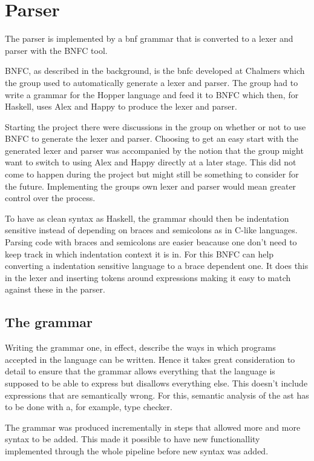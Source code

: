 \section{Parser}


The parser is implemented by a \acrlong{bnf} grammar that is converted to a lexer and 
parser with the BNFC tool. 

BNFC, as described in the background, is the \Gls{bnfc} developed at Chalmers which the group used to automatically generate a lexer and parser. The group had to write a grammar for the Hopper language and feed it to BNFC which then, for Haskell, uses Alex\cite{alex} and Happy\cite{happy} to produce the lexer and parser.

Starting the project there were discussions in the group on whether or not to use BNFC to generate the lexer and parser. Choosing to get an easy start with the generated lexer and parser was accompanied by the notion that the group might want to switch to using Alex and Happy directly at a later stage. This did not come to happen during the project but might still be something to consider for the future. Implementing the groups own lexer and parser would mean greater control over the process.

To have as clean syntax as Haskell, the grammar should then be indentation sensitive instead of depending on braces and semicolons as in C-like languages. Parsing code with braces and semicolons are easier beacause one don't need to keep track in which indentation context it is in. For this BNFC can help converting a indentation sensitive language to a brace dependent one. It does this in the lexer and inserting tokens around expressions making it easy to match against these in the parser.

\subsection{The grammar}

Writing the grammar one, in effect, describe the ways in which programs accepted in the language can be written. Hence it takes great consideration to detail to ensure that the grammar allows everything that the language is supposed to be able to express but disallows everything else. This doesn't include expressions that are semantically wrong. For this, semantic analysis of the \acrshort{ast} has to be done with a, for example, type checker. 

The grammar was produced incrementally in steps that allowed more and more syntax to be added. This made it possible to have new functionallity implemented through the whole pipeline before new syntax was added. 

